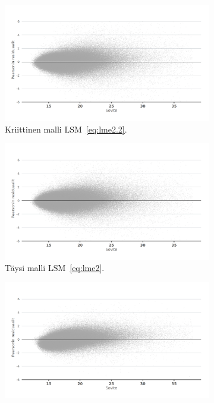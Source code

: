 \documentclass[finnish]{docopts}
\begin{document}
\begin{figure}[H]
\centering
\begin{subfigure}[b]{0.4\textwidth}
\centering
  \includegraphics[width=.8\linewidth]{kuvaajat/lme3_fitresid.png}
  \caption{Kriittinen malli $\text{LSM}$~\ref{eq:lme2.2}.}
  \label{fig:lme_krit_fitresid}
\end{subfigure}%
\begin{subfigure}[b]{0.4\textwidth}
\centering
  \includegraphics[width=.8\linewidth]{kuvaajat/lme3_full_fitresid.png}
  \caption{Täysi malli $\text{LSM}$~\ref{eq:lme2}.}
  \label{fig:lme_taysi_fitresid}
\end{subfigure}
\begin{subfigure}[b]{0.4\textwidth}
\centering
  \includegraphics[width=.8\linewidth]{kuvaajat/lme3_vc_fitresid.png}

\end{subfigure}
\end{figure}
\end{document}
